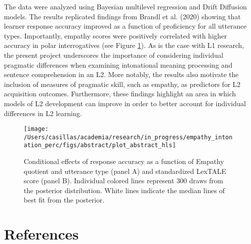 \documentclass[
  12pt,
]{article}
\begin{document}
The data were analyzed using Bayesian multilevel regression and Drift
Diffusion models. The results replicated findings from Brandl et al.
(2020) showing that learner response accuracy improved as a function of
proficiency for all utterance types. Importantly, empathy scores were
positively correlated with higher accuracy in polar interrogatives (see
Figure \ref{fig:plot-2panel-emp-prof}). As is the case with L1 research,
the present project underscores the importance of considering individual
pragmatic differences when examining intonational meaning processing and
sentence comprehension in an L2. More notably, the results also motivate
the inclusion of measures of pragmatic skill, such as empathy, as
predictors for L2 acquisition outcomes. Furthermore, these findings
highlight an area in which models of L2 development can improve in order
to better account for individual differences in L2 learning.

\clearpage

\begin{figure}
\texttt{[image: /Users/casillas/academia/research/in\_progress/empathy\_intonation\_perc/figs/abstract/plot\_abstract\_hls]} \caption{Conditional effects of response accuracy as a function of Empathy 
quotient and utterance type (panel A) and standardized LexTALE score (panel B). 
Individual colored lines represent 300 draws from the posterior distribution. White lines indicate the median lines of best fit from the posterior.}\label{fig:plot-2panel-emp-prof}
\end{figure}

\hypertarget{references}{%
\section{References}\label{references}}

\begingroup
\setlength{\parindent}{-0.5in}
\setlength{\leftskip}{0.5in}

\phantom{.}

\textcolor{white}{\\} \vspace{-0.5in}
\end{document}
